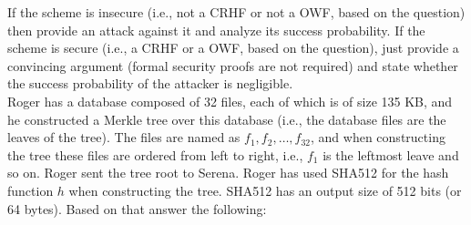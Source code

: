 \documentclass[12pt]{article}
\begin{document}
 If the scheme is insecure (i.e., not a CRHF or not a OWF, based on the question) then provide an attack against it and analyze its success probability. If the scheme is secure (i.e., a CRHF or a OWF, based on the question), just provide a convincing argument (formal security proofs are not required) and state whether the success probability of the attacker is negligible. \\

Roger has a database composed of 32 files, each of which is of size 135 KB, and he constructed a Merkle tree over this database (i.e., the database files are the leaves of the tree). The files are named as $f_1, f_2, \dots, f_{32}$, and when constructing the tree these files are ordered from left to right, i.e., $f_1$ is the leftmost leave and so on. Roger sent the tree root to Serena. Roger has used SHA512 for the hash function $h$ when constructing the tree. SHA512 has an output size of 512 bits (or 64 bytes). Based on that answer the following:
\end{document}
